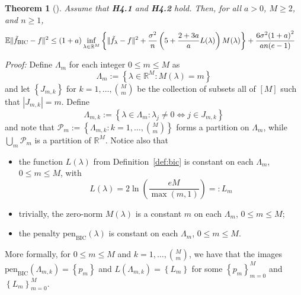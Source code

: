 \documentclass[11pt, letter paper]{article}
\newcommand{\1}{\mathmybb{1}}
\newtheorem{theorem}[proposition]{Theorem}
\newcommand{\R}{\mathbb{R}}
\newcommand{\0}{\emptyset}
\newcommand{\E}{\mathbb{E}}
\newcommand{\paren}[1]{\left(#1 \right)}
\newcommand{\set}[1]{\left\{ #1 \right\}}
\newcommand{\norm}[1]{|\hspace{-1pt}|#1 |\hspace{-1pt}|}
\newcommand{\normsq}[1]{\norm{#1}^{2}}
\newcommand{\ftilde}[1]{\tilde{f}_{#1}}
\newcommand{\penBIC}[1]{\mathrm{pen}_{\mathrm{BIC}}\paren{#1}}
\begin{document}
\begin{theorem}[\cite{bunea_2007}]\label{thm:bunea31}
    Assume that \textbf{H4.1} and \textbf{H4.2} hold. Then, for all \(a>0\), \(M\geq 2\), and \(n\geq 1\),
    \begin{align*}
        \E\normsq{\ftilde{\mathrm{BIC}} - f} &\leq (1+a)\inf_{\lambda\in\R^{M}}\set{\normsq{\ftilde{\lambda} - f} + \frac{\sigma^{2}}{n}\paren{5+\frac{2+3a}{a}{L(\lambda)}}M(\lambda)} + \frac{6\sigma^{2}{(1+a)}^{2}}{an(e-1)}
    \end{align*}

\end{theorem}

\begin{myproofbox}
    \textit{Proof: }Define \(\Lambda_{m}\) for each integer \(0\leq m\leq M\) as
    \[\Lambda_{m}:=\set{\lambda\in\R^{M} : M(\lambda) = m}\]
    and let \(\set{J_{m,k}}\) for \(k=1,\ldots,\binom{M}{m}\) be the collection of subsets all of \([M]\) such that \(|J_{m,k}| = m\). Define
    \[\Lambda_{m,k} :=\set{\lambda\in\Lambda_{m}:\lambda_{j}\neq 0 \iff j\in J_{m,k}}\]
    and note that \(\mathcal{P}_{m}:=\set{\Lambda_{m,k}:k=1,\ldots,\binom{M}{m}}\) forms a partition on \(\Lambda_{m}\), while \(\bigcup_{m}\mathcal{P}_{m}\) is a partition of \(\R^{M}\). Notice also that
    \begin{itemize}
        \item the function \(L(\lambda)\) from Definition~\ref{def:bic} is constant on each \(\Lambda_{m}\), \(0\leq m\leq M\), with\[L(\lambda) = 2\ln\paren{\frac{eM}{\max(m, 1)}} =: L_{m}\]
        \item trivially, the zero-norm \(M(\lambda)\) is a constant \(m\) on each \(\Lambda_{m}\), \(0\leq m\leq M\);
        \item the penalty \(\penBIC{\lambda}\) is constant on each \(\Lambda_{m}\), \(0\leq m\leq M\).
    \end{itemize}
    More formally, for \(0\leq m\leq M\) and \(k=1,\ldots,\binom{M}{m}\), we have that the images \(\penBIC{\Lambda_{m,k}} = \set{p_{m}}\) and \(L(\Lambda_{m,k})=\set{L_{m}}\) for some \(\set{p_{m}}_{m=0}^{M}\) and \(\set{L_{m}}_{m=0}^{M}\).
    

\end{myproofbox}
\end{document}
